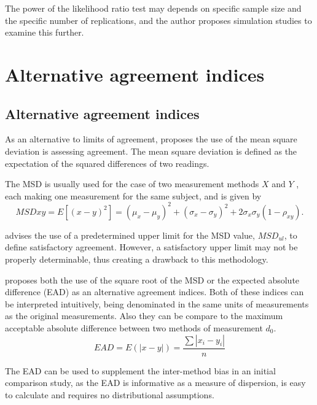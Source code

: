 \documentclass[12pt, a4paper]{report}
\theoremstyle{plain}
\theoremstyle{definition}
\theoremstyle{remark}
\begin{document}
	The power of the likelihood ratio test may depends on specific sample size and the
	specific number of  replications, and the author proposes simulation studies to examine this further.
	
	

	\chapter{Alternative agreement indices}
	
	\section{Alternative agreement indices}
	As an alternative to limits of agreement, \citet{lin2002} proposes the use of the mean square deviation is assessing agreement. The mean square deviation is defined as the expectation of the squared differences	of two readings. 
	
	The MSD is usually used for the case of two
	measurement methods $X$ and $Y$ , each making one measurement for	the same subject, and is given by
	\[
	MSDxy = E[(x - y)^2]  = (\mu_{x} - \mu_{y})^2 + (\sigma_{x} -
	\sigma_{y})^2 + 2\sigma_{x}\sigma_{y}(1-\rho_{xy}).
	\]
	
	
	\citet{Barnhart} advises the use of a predetermined upper limit
	for the MSD value, $MSD_{ul}$, to define satisfactory agreement.
	However, a satisfactory upper limit may not be properly
	determinable, thus creating a drawback to this methodology.
	
	
	\citet{Barnhart} proposes both the use of the square root of the
	MSD or the expected absolute difference (EAD) as an alternative agreement indices. Both of these indices can be interpreted intuitively, being denominated in the same units of measurements as the original
	measurements. Also they can be compare to the maximum acceptable
	absolute difference between two methods of measurement $d_{0}$.
	\[
	EAD = E(|x - y|) = \frac{\sum |x_{i}- y_{i}|}{n}
	\]
	
	The EAD can be used to supplement the inter-method bias in an
	initial comparison study, as the EAD is informative as a measure
	of dispersion, is easy to calculate and requires no distributional
	assumptions.
	
\end{document}
